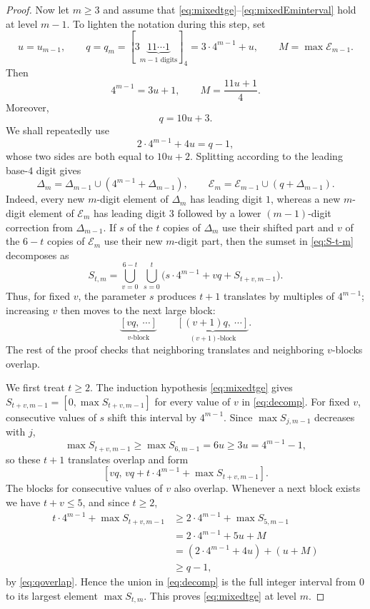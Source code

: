 \documentclass[12pt]{article}
\theoremstyle{plain}
\theoremstyle{definition}
\theoremstyle{plain}
\begin{document}
\begin{proof}
Now let $m\geq3$ and assume that
\eqref{eq:mixedtge}--\eqref{eq:mixedEminterval} hold at level $m-1$.
To lighten the notation during this step, set
\[
 u=u_{m-1},\qquad
 q=q_m=[3\underbrace{11\cdots1}_{m-1\text{ digits}}]_4
      =3\cdot4^{m-1}+u,\qquad
 M=\max\mathcal E_{m-1}.
\]
Then
\[
 4^{m-1}=3u+1,\qquad
 M=\frac{11u+1}{4}.
\]
Moreover,
\begin{equation}\label{eq:qmdef}
 q=10u+3.
\end{equation}
We shall repeatedly use
\begin{equation}\label{eq:qoverlap}
 2\cdot4^{m-1}+4u=q-1,
\end{equation}
whose two sides are both equal to $10u+2$.  Splitting according to the
leading base-$4$ digit gives
\[
 \Delta_m=\Delta_{m-1}\cup(4^{m-1}+\Delta_{m-1}),\qquad
 \mathcal E_{m}=\mathcal E_{m-1}\cup(q+\Delta_{m-1}).
\]
Indeed, every new $m$-digit element of $\Delta_m$ has leading digit $1$,
whereas a new $m$-digit element of $\mathcal E_{m}$ has leading digit $3$
followed by a lower $(m-1)$-digit correction from $\Delta_{m-1}$.  If $s$ of
the $t$ copies of $\Delta_m$ use their shifted part and $v$ of the $6-t$
copies of $\mathcal E_{m}$ use their new $m$-digit part, then the sumset in
\eqref{eq:S-t-m} decomposes as
\begin{equation}\label{eq:decomp}
 S_{t,m}=\bigcup_{v=0}^{6-t}\ \bigcup_{s=0}^{t}
 \bigl(s\cdot4^{m-1}+vq+S_{t+v,m-1}\bigr).
\end{equation}
Thus, for fixed $v$, the parameter $s$ produces $t+1$ translates by
multiples of $4^{m-1}$; increasing $v$ then moves to the next large block:
\[
 \underbrace{[vq,\ \cdots]}_{v\text{-block}}
 \qquad
 \underbrace{[(v+1)q,\ \cdots]}_{(v+1)\text{-block}}.
\]
The rest of the proof checks that neighboring translates and neighboring
$v$-blocks overlap.

We first treat $t\geq2$.  The induction hypothesis
\eqref{eq:mixedtge} gives $S_{t+v,m-1}=[0,\max S_{t+v,m-1}]$ for every
value of $v$ in \eqref{eq:decomp}.  For fixed $v$, consecutive values of
$s$ shift this interval by $4^{m-1}$.  Since $\max S_{j,m-1}$ decreases
with $j$,
\[
 \max S_{t+v,m-1}\geq\max S_{6,m-1}=6u
     \geq3u=4^{m-1}-1,
\]
so these $t+1$ translates overlap and form
\[
 [vq,\,vq+t\cdot4^{m-1}+\max S_{t+v,m-1}].
\]
The blocks for consecutive values of $v$ also overlap.  Whenever a next
block exists we have $t+v\leq5$, and since $t\geq2$,
\[
\begin{aligned}
 t\cdot4^{m-1}+\max S_{t+v,m-1}
 &\geq2\cdot4^{m-1}+\max S_{5,m-1}\\
 &=2\cdot4^{m-1}+5u+M\\
 &=(2\cdot4^{m-1}+4u)+(u+M)\\
 &\geq q-1,
\end{aligned}
\]
by \eqref{eq:qoverlap}.  Hence the union in \eqref{eq:decomp} is the
full integer interval from $0$ to its largest element $\max S_{t,m}$.
This proves \eqref{eq:mixedtge} at level $m$.


\end{proof}
\end{document}
